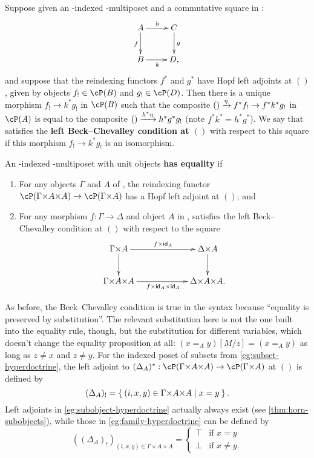 \begin{defn}
  Suppose given an \cS-indexed \fS-multiposet \cP and a commutative square in \cS:
  \[ \xymatrix{ A \ar[r]^h \ar[d]_f & C \ar[d]^g \\ B \ar[r]_k & D, } \]
  and suppose that the reindexing functors $f^*$ and $g^*$ have Hopf left adjoints at $()$, given by objects $f_!\in \cP(B)$ and $g_!\in \cP(D)$.
  Then there is a unique morphism $f_! \to k^* g_!$ in $\cP(B)$ such that the composite $() \xrightarrow{\eta} f^* f_! \to f^* k^* g_!$ in $\cP(A)$ is equal to the composite $() \xrightarrow{h^* \eta} h^* g^* g_!$ (note $f^* k^* = h^* g^*$).
  We say that \cP satisfies the \textbf{left Beck--Chevalley condition at $()$} with respect to this square if this morphism $f_! \to k^* g_!$ is an isomorphism.
\end{defn}

\begin{defn}
  An \cS-indexed \fS-multiposet with unit objects \textbf{has equality} if
  \begin{enumerate}
  \item For any objects $\Gamma$ and $A$ of \cS, the reindexing functor $\cP(\Gamma\times A\times A) \to \cP(\Gamma\times A)$ has a Hopf left adjoint at $()$; and
  \item For any morphism $f:\Gamma\to\Delta$ and object $A$ in \cS, \cP satisfies the left Beck--Chevalley condition at $()$ with respect to the square
    \[ \xymatrix@C=5pc{ \Gamma\times A \ar[r]^{f\times \idfunc_A} \ar[d] & \Delta\times A \ar[d] \\
      \Gamma\times A\times A \ar[r]_{f\times \idfunc_A \times \idfunc_A} & \Delta\times A\times A. } \]
  \end{enumerate}
\end{defn}

As before, the Beck--Chevalley condition is true in the syntax because ``equality is preserved by substitution''.
The relevant substitution here is not the one built into the equality rule, though, but the substitution for different variables, which doesn't change the equality proposition at all: $(x=_A y)[M/z] = (x=_A y)$ as long as $z\neq x$ and $z\neq y$.
For the indexed poset of subsets from \cref{eg:subset-hyperdoctrine}, the left adjoint to $(\Delta_A)^* : \cP(\Gamma\times A\times A) \to \cP(\Gamma\times A)$ at $()$ is defined by
\[ (\Delta_A)_! = \setof{ (i,x,y)\in \Gamma\times A\times A | x=y }. \]
Left adjoints in \cref{eg:subobject-hyperdoctrine} actually always exist (see \cref{thm:horn-subobjects}), while those in \cref{eg:family-hyperdoctrine} can be defined by
\[ ((\Delta_A)_!)_{(i,x,y)\in \Gamma\times A\times A} =
\begin{cases}
  \top &\text{if } x=y\\
  \bot &\text{if } x\neq y.
\end{cases}
\]

